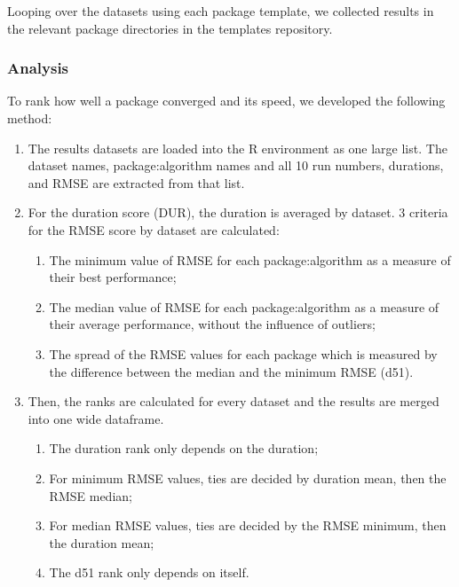 Looping over the datasets using each package template, we collected
results in the relevant package directories in the templates repository.

\hypertarget{analysis}{%
\subsubsection{Analysis}\label{analysis}}

To rank how well a package converged and its speed, we developed the
following method:

\begin{enumerate}
\def\labelenumi{\arabic{enumi}.}
\tightlist
\item
  The results datasets are loaded into the R environment as one large
  list. The dataset names, package:algorithm names and all 10 run
  numbers, durations, and RMSE are extracted from that list.
\item
  For the duration score (DUR), the duration is averaged by dataset. 3
  criteria for the RMSE score by dataset are calculated:

  \begin{enumerate}
  \def\labelenumii{\alph{enumii}.}
  \tightlist
  \item
    The minimum value of RMSE for each package:algorithm as a measure of
    their best performance;
  \item
    The median value of RMSE for each package:algorithm as a measure of
    their average performance, without the influence of outliers;
  \item
    The spread of the RMSE values for each package which is measured by
    the difference between the median and the minimum RMSE (d51).
  \end{enumerate}
\item
  Then, the ranks are calculated for every dataset and the results are
  merged into one wide dataframe.

  \begin{enumerate}
  \def\labelenumii{\alph{enumii}.}
  \tightlist
  \item
    The duration rank only depends on the duration;
  \item
    For minimum RMSE values, ties are decided by duration mean, then the
    RMSE median;
  \item
    For median RMSE values, ties are decided by the RMSE minimum, then
    the duration mean;
  \item
    The d51 rank only depends on itself.
  \end{enumerate}
\end{enumerate}

